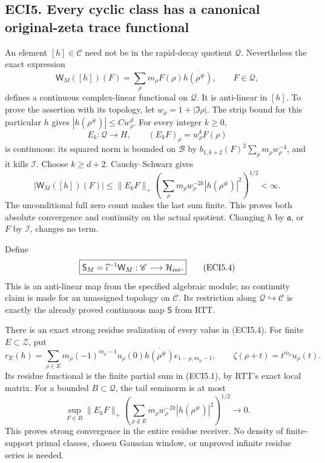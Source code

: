 \subsection{ECI5. Every cyclic class has a canonical original-zeta trace
functional}\label{eci5.-every-cyclic-class-has-a-canonical-original-zeta-trace-functional}

An element \([h]\in\mathscr C\) need not be in the rapid-decay quotient
\(\mathcal Q\). Nevertheless the exact expression \[
\mathsf W_M([h])(F)
=\sum_\rho m_\rho F(\rho)\overline{h(\rho^\#)},
\qquad F\in\mathcal Q,
\tag{ECI5.1}
\] defines a continuous complex-linear functional on \(\mathcal Q\). It
is anti-linear in \([h]\). To prove the assertion with its topology, let
\(w_\rho=1+|\Im\rho|\). The strip bound for this particular \(h\) gives
\(|h(\rho^\#)|\le Cw_\rho^d\). For every integer \(k\ge0\), \[
E_k:\mathcal Q\to H,\qquad (E_kF)_\rho=w_\rho^kF(\rho)
\tag{ECI5.2}
\] is continuous: its squared norm is bounded on \(\mathcal B\) by
\(b_{1,k+2}(F)^2\sum_\rho m_\rho w_\rho^{-4}\), and it kills
\(\mathcal I\). Choose \(k\ge d+2\). Cauchy--Schwarz gives \[
|\mathsf W_M([h])(F)|
\le\|E_kF\|_+
\left(\sum_\rho m_\rho w_\rho^{-2k}|h(\rho^\#)|^2\right)^{1/2}<\infty.
\tag{ECI5.3}
\] The unconditional full zero count makes the last sum finite. This
proves both absolute convergence and continuity on the actual quotient.
Changing \(h\) by \(\mathfrak a\), or \(F\) by \(\mathcal I\), changes
no term.

Define \[
\boxed{\mathsf S_M=\widehat\iota^{-1}\mathsf W_M:
\mathscr C\longrightarrow\mathcal H_{\rm res}.}
\tag{ECI5.4}
\] This is an anti-linear map from the specified algebraic module; no
continuity claim is made for an unassigned topology on \(\mathscr C\).
Its restriction along \(\mathcal Q\hookrightarrow\mathscr C\) is exactly
the already proved continuous map \(\mathsf S\) from RTT.

There is an exact strong residue realization of every value in (ECI5.4).
For finite \(E\subset\mathscr Z\), put \[
r_E(h)=\sum_{\rho\in E}
m_\rho(-1)^{m_\rho-1}u_\rho(0)
\overline{h(\rho^\#)}e_{1-\rho,m_\rho-1},
\qquad
\zeta(\rho+t)=t^{m_\rho}u_\rho(t).
\tag{ECI5.5}
\] Its residue functional is the finite partial sum in (ECI5.1), by
RTT's exact local matrix. For a bounded \(B\subset\mathcal Q\), the tail
seminorm is at most \[
\sup_{F\in B}\|E_kF\|_+
\left(\sum_{\rho\notin E}m_\rho w_\rho^{-2k}|h(\rho^\#)|^2\right)^{1/2}
\longrightarrow0.
\tag{ECI5.6}
\] This proves strong convergence in the entire residue receiver. No
density of finite-support primal classes, chosen Gaussian window, or
unproved infinite residue series is needed.


